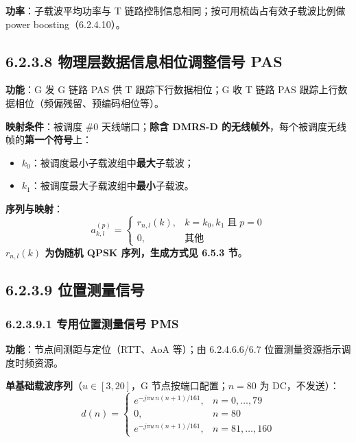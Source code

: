 \documentclass[11pt,a4paper]{ctexart}
\begin{document}
\textbf{功率}：子载波平均功率与 T 链路控制信息相同；按可用梳齿占有效子载波比例做 power boosting（6.2.4.10）。

\subsection{6.2.3.8 物理层数据信息相位调整信号 PAS}

\textbf{功能}：G 发 G 链路 PAS 供 T 跟踪下行数据相位；G 收 T 链路 PAS 跟踪上行数据相位（频偏残留、预编码相位等）。

\textbf{映射条件}：被调度 \#0 天线端口；\textbf{除含 DMRS-D 的无线帧外}，每个被调度无线帧的\textbf{第一个符号}上：
\begin{itemize}[nosep]
  \item $k_0$：被调度最小子载波组中\textbf{最大}子载波；
  \item $k_1$：被调度最大子载波组中\textbf{最小}子载波。
\end{itemize}

\textbf{序列与映射}：
\begin{equation}
a_{k,l}^{(p)} = \begin{cases} r_{n,l}(k), & k=k_0,k_1 \;\text{且}\; p=0 \\ 0, & \text{其他} \end{cases}
\end{equation}
\textbf{$r_{n,l}(k)$ 为伪随机 QPSK 序列，生成方式见 6.5.3 节}。

\subsection{6.2.3.9 位置测量信号}

\subsubsection{6.2.3.9.1 专用位置测量信号 PMS}

\textbf{功能}：节点间测距与定位（RTT、AoA 等）；由 6.2.4.6.6/6.7 位置测量资源指示调度时频资源。

\textbf{单基础载波序列}（$u{\in}[3,20]$，G 节点按端口配置；$n{=}80$ 为 DC，不发送）：
\begin{equation}
d(n) = \begin{cases}
e^{-j\pi u\, n (n+1) / 161}, & n=0,\ldots,79 \\[0.2em]
0, & n=80 \\[0.2em]
e^{-j\pi u\, n (n+1) / 161}, & n=81,\ldots,160
\end{cases}
\end{equation}
\end{document}
